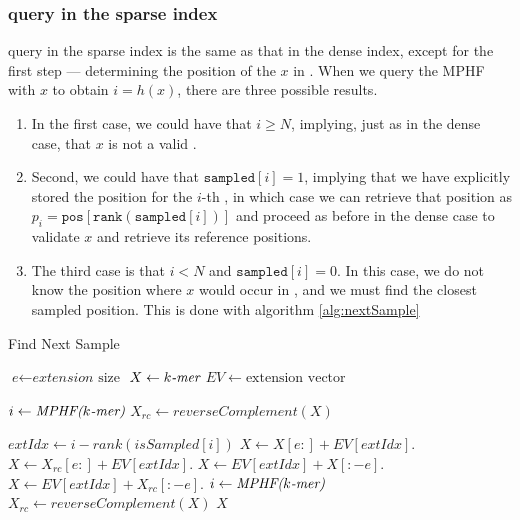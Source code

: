\subsubsection*{\kmer query in the sparse \pufferfish index}  \kmer query in the sparse \pufferfish index
is the same as that in the dense index, except for the first step ---
determining the position of the \kmer $x$ in \cseq. When we query the MPHF with
$x$ to obtain $i = h(x)$, there are three possible results. 
\begin{enumerate}
\item In the first case,
we could have that $i \geq N$, implying, just as in the dense case, that $x$ is
not a valid \kmer. 
\item Second, we could have that $\texttt{sampled}[i] = 1$,
implying that we have explicitly stored the position for the $i$-th \kmer, in
which case we can retrieve that position as $p_{i} = \texttt{pos}[\texttt{rank}(\texttt{sampled}[i])]$ and
proceed as before in the dense case to validate $x$ and retrieve its reference positions.
\item The third case is that $i < N$ and $\texttt{sampled}[i] = 0$. In this case, we do not know
the position where $x$ would occur in \cseq, and we must find the closest sampled position.
This is done with algorithm \ref{alg:nextSample}
\end{enumerate}

\begin{algorithm}
\caption{Find Next Sample}\label{alg:nextSample}
\begin{algorithmic}[1]
\State $\textit{e} \gets \textit{extension} \text{ size}$
\State $X \gets \textit{$k$-mer}$
\State $EV \gets \text{extension vector}$

\State $i \gets \textit{MPHF($k$-mer)}$
\State $X_{rc} \gets \textit{reverseComplement}(X)$

\State $extIdx \gets i-rank(isSampled[i])$
\State $X \gets X[e:] + EV[extIdx]$.
\EndIf
{}
\State $X \gets X_{rc}[e:] + EV[extIdx]$.
\EndIf
{}
\State $X \gets EV[extIdx] + X[:-e]$.
\EndIf
{}
\State $X \gets EV[extIdx] + X_{rc}[:-e]$.
\EndIf
\State $i \gets \textit{MPHF($k$-mer)}$
\State $X_{rc} \gets \textit{reverseComplement}(X)$
\EndWhile
\Return $X$
\EndProcedure
\end{algorithmic}
\end{algorithm}


